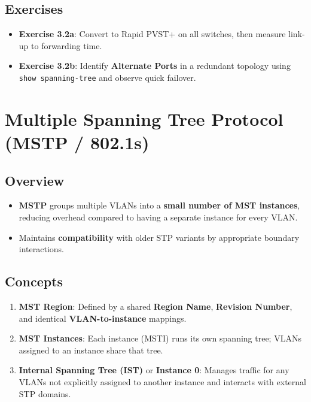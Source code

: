 \documentclass[a4paper]{report}
\begin{document}
\subsection{Exercises}
\begin{itemize}
    \item \textbf{Exercise 3.2a}: Convert to Rapid PVST+ on all switches, then measure link-up to forwarding time.
    \item \textbf{Exercise 3.2b}: Identify \textbf{Alternate Ports} in a redundant topology using \texttt{show spanning-tree} and observe quick failover.
\end{itemize}

\section{Multiple Spanning Tree Protocol (MSTP / 802.1s)}

\subsection{Overview}
\begin{itemize}
    \item \textbf{MSTP} groups multiple VLANs into a \textbf{small number of MST instances}, reducing overhead compared to having a separate instance for every VLAN.
    \item Maintains \textbf{compatibility} with older STP variants by appropriate boundary interactions.
\end{itemize}

\subsection{Concepts}
\begin{enumerate}
    \item \textbf{MST Region}: Defined by a shared \textbf{Region Name}, \textbf{Revision Number}, and identical \textbf{VLAN-to-instance} mappings.
    \item \textbf{MST Instances}: Each instance (MSTI) runs its own spanning tree; VLANs assigned to an instance share that tree.
    \item \textbf{Internal Spanning Tree (IST)} or \textbf{Instance 0}: Manages traffic for any VLANs not explicitly assigned to another instance and interacts with external STP domains.
\end{enumerate}
\end{document}
